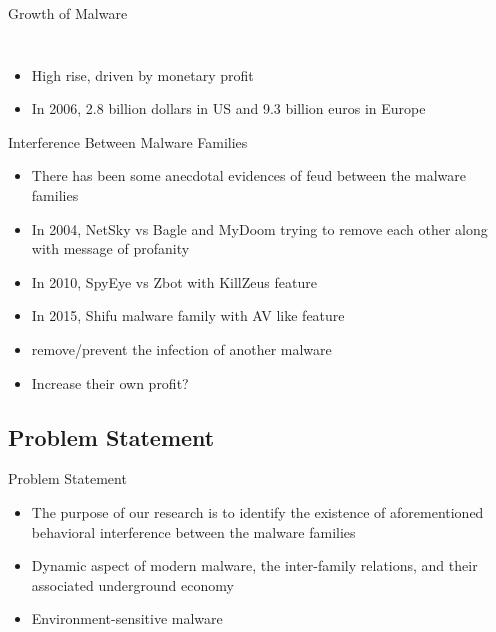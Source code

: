 \documentclass{beamer}
\begin{document}
\begin{frame}[plain]{Growth of Malware}
\begin{columns}
\begin{column}{5cm}
\begin{figure}[H]
\begin{center}
        \end{center}
      \end{figure}
    \end{column}
  \end{columns}
  \begin{itemize}
    \item High rise, driven by monetary profit
    \item In 2006, 2.8 billion dollars in US and 9.3 billion euros in Europe
  \end{itemize}
\end{frame}
\begin{frame}[t]{Interference Between Malware Families}
  \begin{itemize}
    \item There has been some anecdotal evidences of feud between the malware families
    \item In 2004, NetSky vs Bagle and MyDoom trying to remove each other along with message of profanity
    \item In 2010, SpyEye vs Zbot with KillZeus feature
    \item In 2015, Shifu malware family with AV like feature
    \item remove/prevent the infection of another malware
    \item Increase their own profit?
  \end{itemize}
\end{frame}
\subsection{Problem Statement}
\label{sub:Problem Statement}
\begin{frame}[t]{Problem Statement}
\begin{itemize}
  \item The purpose of our research is to identify the existence of aforementioned behavioral interference between the malware families
  \item Dynamic aspect of modern malware, the inter-family relations, and their associated underground economy
  \item Environment-sensitive malware
\end{itemize}
\end{frame}
\end{document}
